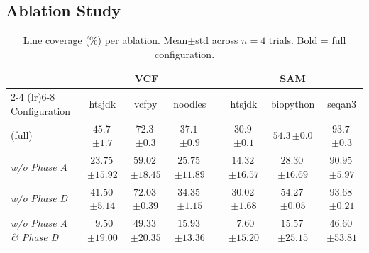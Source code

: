 
\subsection{Ablation Study}
\label{sec:ablation}

\begin{table}[!t]
\centering
\caption{Line coverage (\%) per ablation. Mean$\pm$std across $n{=}4$ trials. Bold = full configuration.}
\label{tab:ablation-coverage}
\footnotesize
\setlength{\tabcolsep}{3.5pt}
\renewcommand{\arraystretch}{1.05}
\begin{tabular}{l c c c c c c c}
\toprule
& \multicolumn{3}{c}{\textbf{VCF}}
& & \multicolumn{3}{c}{\textbf{SAM}} \\
\cmidrule(lr){2-4} \cmidrule(lr){6-8}
Configuration & htsjdk & vcfpy & noodles & & htsjdk & biopython & seqan3 \\
\midrule
\textbf{\biotest{}} (full)
  & $\mathbf{45.7}$\,{\scriptsize$\pm1.7$}
  & $\mathbf{72.3}$\,{\scriptsize$\pm0.3$}
  & $\mathbf{37.1}$\,{\scriptsize$\pm0.9$}
  &
  & $\mathbf{30.9}$\,{\scriptsize$\pm0.1$}
  & $\mathbf{54.3}$\,{\scriptsize$\pm0.0$}
  & $\mathbf{93.7}$\,{\scriptsize$\pm0.3$} \\
\textit{w/o Phase A}
  & $23.75$\,{\scriptsize$\pm15.92$}
  & $59.02$\,{\scriptsize$\pm18.45$}
  & $25.75$\,{\scriptsize$\pm11.89$}
  &
  & $14.32$\,{\scriptsize$\pm16.57$}
  & $28.30$\,{\scriptsize$\pm16.69$}
  & $90.95$\,{\scriptsize$\pm5.97$} \\
\textit{w/o Phase D}
  & $41.50$\,{\scriptsize$\pm5.14$}
  & $72.03$\,{\scriptsize$\pm0.39$}
  & $34.35$\,{\scriptsize$\pm1.15$}
  &
  & $30.02$\,{\scriptsize$\pm1.68$}
  & $54.27$\,{\scriptsize$\pm0.05$}
  & $93.68$\,{\scriptsize$\pm0.21$} \\
\textit{w/o Phase A \& Phase D}
  & $\phantom{0}9.50$\,{\scriptsize$\pm19.00$}
  & $49.33$\,{\scriptsize$\pm20.35$}
  & $15.93$\,{\scriptsize$\pm13.36$}
  &
  & $\phantom{0}7.60$\,{\scriptsize$\pm15.20$}
  & $15.57$\,{\scriptsize$\pm25.15$}
  & $46.60$\,{\scriptsize$\pm53.81$} \\
\bottomrule
\end{tabular}
\end{table}

